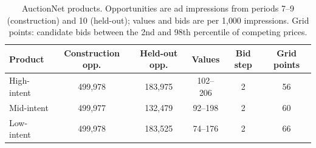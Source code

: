 \begin{table}[h!]
\caption{AuctionNet products. Opportunities are ad impressions from periods 7--9 (construction) and 10 (held-out); values and bids are per 1{,}000 impressions. Grid points: candidate bids between the 2nd and 98th percentile of competing prices.}
\label{tab:andata}
\footnotesize
\centering

\begin{tabular}{lccccc}
\toprule
Product & Construction opp. & Held-out opp. & Values & Bid step & Grid points \\
\midrule
High-intent & 499,978 & 183,975 & 102--206 & 2 & 56 \\
Mid-intent & 499,977 & 132,479 & 92--198 & 2 & 60 \\
Low-intent & 499,978 & 183,525 & 74--176 & 2 & 66 \\
\bottomrule
\end{tabular}
\end{table}
